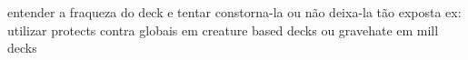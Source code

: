 entender a fraqueza do deck e tentar constorna-la ou não deixa-la tão exposta ex: utilizar protects contra globais em creature based decks ou gravehate em mill decks